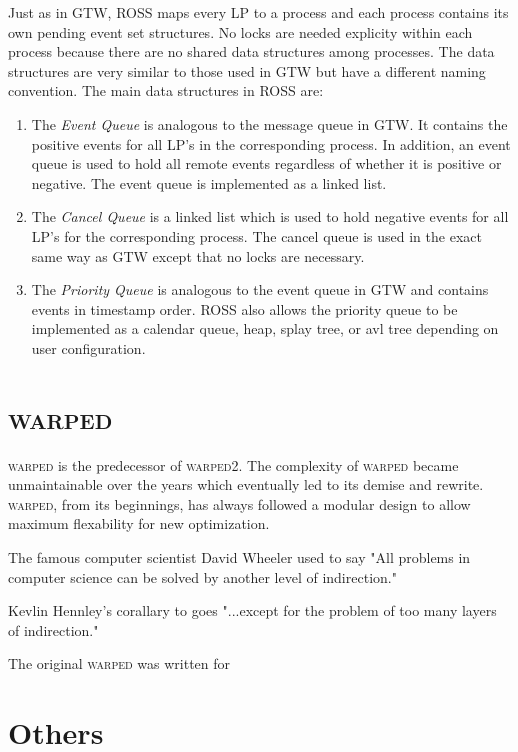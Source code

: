 \documentclass[11pt]{book}
\begin{document}
Just as in GTW, ROSS maps every LP to a process and each process contains its own pending
event set structures. No locks are needed explicity within each process because there are
no shared data structures among processes. The data structures are very similar to those
used in GTW but have a different naming convention. The main data structures in ROSS are:

\begin{enumerate}
    \item The \emph{Event Queue} is analogous to the message queue in GTW. It contains the
        positive events for all LP's in the corresponding process. In addition, an event
        queue is used to hold all remote events regardless of whether it is positive or
        negative. The event queue is implemented as a linked list.
    \item The \emph{Cancel Queue} is a linked list which is used to hold negative events
        for all LP's for the corresponding process. The cancel queue is used in the exact
        same way as GTW except that no locks are necessary.
    \item The \emph{Priority Queue} is analogous to the event queue in GTW and contains
        events in timestamp order. ROSS also allows the priority queue to be implemented
        as a calendar queue, heap, splay tree, or avl tree depending on user configuration.
\end{enumerate}

\section{\textsc{warped}}

\textsc{warped} is the predecessor of \textsc{warped2}. The complexity of \textsc{warped}
became unmaintainable over the years which eventually led to its demise and rewrite.
\textsc{warped}, from its beginnings, has always followed a modular design to allow maximum
flexability for new optimization.

The famous computer scientist David Wheeler used to say "All problems in computer science
can be solved by another level of indirection."

Kevlin Hennley's corallary to goes "...except for the problem of too many layers of
indirection."

The original \textsc{warped} was written for 

\section{Others}
\end{document}
